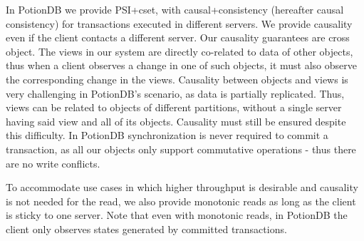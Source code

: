 In PotionDB we provide PSI+cset, with causal+consistency (hereafter causal consistency) for transactions executed in different servers.
We provide causality even if the client contacts a different server. 
Our causality guarantees are cross object.
The views in our system are directly co-related to data of other objects, thus when a client observes a change in one of such objects, it must also observe the corresponding change in the views.
Causality between objects and views is very challenging in PotionDB's scenario, as data is partially replicated.
Thus, views can be related to objects of different partitions, without a single server having said view and all of its objects.
Causality must still be ensured despite this difficulty.
In PotionDB synchronization is never required to commit a transaction, as all our objects only support commutative operations - thus there are no write conflicts. 


To accommodate use cases in which higher throughput is desirable and causality is not needed for the read, we also provide monotonic reads as long as the client is sticky to one server.
Note that even with monotonic reads, in PotionDB the client only observes states generated by committed transactions.

